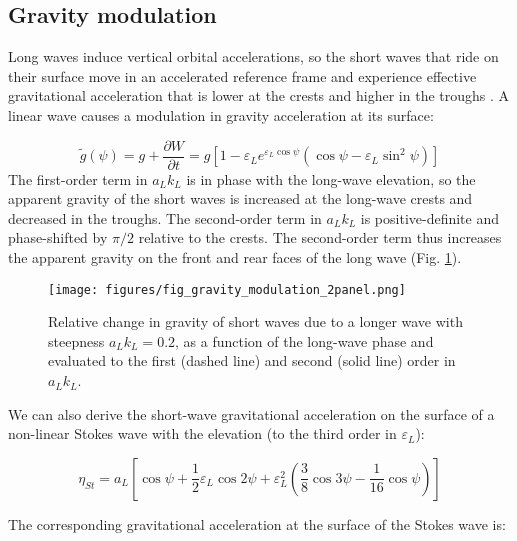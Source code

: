 \documentclass[draft]{agujournal2019}
\begin{document}
\subsection{Gravity modulation}
\label{subsection:gravity_modulation}

Long waves induce vertical orbital accelerations, so the short
waves that ride on their surface move in an accelerated reference frame and
experience effective gravitational acceleration that is lower at the crests and
higher in the troughs \cite{longuet1986eulerian,longuet1987propagation}.
A linear wave causes a modulation in gravity acceleration at its surface:

\begin{equation}
\label{eq:gravity_modulation_linear}
\widetilde{g}(\psi) = g + \dfrac{\partial W}{\partial t} = g \left[
  1 - \varepsilon_L e^{\varepsilon_L \cos{\psi}} \left(
    \cos{\psi} - \varepsilon_L \sin^2{\psi}
  \right)
\right]
\end{equation}
The first-order term in $a_L k_L$ is in phase with the long-wave elevation,
so the apparent gravity of the short waves is increased at the long-wave crests
and decreased in the troughs.
The second-order term in $a_L k_L$ is positive-definite and phase-shifted by
$\pi/2$ relative to the crests.
The second-order term thus increases the apparent gravity on the front and rear
faces of the long wave (Fig. \ref{fig:gravity_modulation}).

\begin{figure}[h]
\label{fig:gravity_modulation}
\centering
\texttt{[image: figures/fig\_gravity\_modulation\_2panel.png]}
\caption{
  Relative change in gravity of short waves due to a longer wave with steepness $a_L k_L = 0.2$,
  as a function of the long-wave phase and evaluated to the first (dashed line) and second (solid line) order in $a_L k_L$.
}
\end{figure}

We can also derive the short-wave gravitational acceleration on the surface of
a non-linear Stokes wave with the elevation (to the third order in $\varepsilon_L$):

\begin{equation}
\label{eq:eta_stokes}
\eta_{St} = a_L \left[
  \cos{\psi} +
  \dfrac{1}{2} \varepsilon_L \cos{2\psi} +
  \varepsilon_L^2 \left( \dfrac{3}{8} \cos{3\psi} - \dfrac{1}{16} \cos{\psi} \right)
\right]
\end{equation}

The corresponding gravitational acceleration at the surface of the Stokes wave
is:
\end{document}

